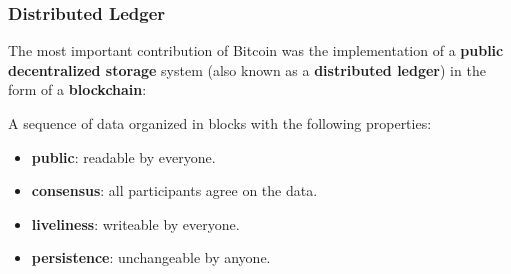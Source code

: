 \documentclass[12pt,titlepage]{article}
\begin{document}
\subsubsection{Distributed Ledger}
The most important contribution of Bitcoin was the implementation of a \textbf{public decentralized storage} system (also known as a \textbf{distributed ledger}) in the form of a \textbf{blockchain}:

A sequence of data organized in blocks with the following properties:\begin{itemize}
	\item \textbf{public}: readable by everyone.
	\item \textbf{consensus}: all participants agree on the data.
	\item \textbf{liveliness}: writeable by everyone.
	\item \textbf{persistence}: unchangeable by anyone.
\end{itemize}
\end{document}
